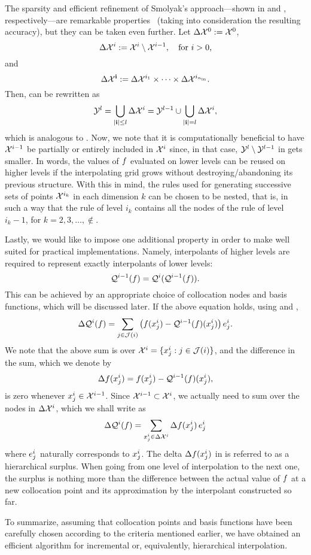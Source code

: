 The sparsity and efficient refinement of Smolyak's approach---shown in
 and , respectively---are
remarkable properties \perse\ (taking into consideration the resulting
accuracy), but they can be taken even further. Let $\Delta\mathcal{X}^0 := \mathcal{X}^0$,
\[
  \Delta\mathcal{X}^i := \mathcal{X}^i \setminus \mathcal{X}^{i - 1}, \quad \text{for $i > 0$,}
\]
and
\[
  \Delta\mathcal{X}^{\mathbf{i}} := \Delta\mathcal{X}^{i_1} \times \cdots \times \Delta\mathcal{X}^{i_{n_\text{in}}}.
\]
Then,  can be rewritten as
\begin{equation} \elab{smolyak-grid-incremental}
  \Y^l = \bigcup_{|\vi| \leq l} \Delta\X^i = \Y^{l - 1} \cup \bigcup_{|\vi| = l} \Delta\X^i,
\end{equation}
which is analogous to . Now, we note that it is
computationally beneficial to have $\mathcal{X}^{i - 1}$ be partially or entirely
included in $\mathcal{X}^i$ since, in that case, $\mathcal{Y}^l \setminus \mathcal{Y}^{l - 1}$ in
 gets smaller. In words, the values of $f$
evaluated on lower levels can be reused on higher levels if the interpolating
grid grows without destroying/abandoning its previous structure. With this in
mind, the rules used for generating successive sets of points $\mathcal{X}^{i_k}$ in each
dimension $k$ can be chosen to be nested, that is, in such a way that the rule
of level $i_k$ contains all the nodes of the rule of level $i_k - 1$, for $k =
2, 3, \dots, \nin$.

Lastly, we would like to impose one additional property in order to make
 well suited for practical implementations. Namely,
interpolants of higher levels are required to represent exactly interpolants
of lower levels:
\begin{equation} \elab{tensor-exactness}
  \tensor{i - 1}(\f) = \tensor{i}(\tensor{i - 1}(\f)).
\end{equation}
This can be achieved by an appropriate choice of collocation nodes and basis
functions, which will be discussed later. If the above equation holds, using
 and ,
\[
  \Delta\mathcal{Q}^{i}(f) = \sum_{j \in \mathcal{J}(i)} \left(f(x^i_j) - \mathcal{Q}^{i - 1}(f)(x^i_j)\right) e^i_j.
\]
We note that the above sum is over $\mathcal{X}^i = \{ x^i_j: j \in \mathcal{J}(i) \}$, and
the difference in the sum, which we denote by
\begin{equation} \elab{surplus}
  \surplus(\x^i_j) = \f(\x^i_j) - \tensor{i - 1}(\f)(\x^i_j),
\end{equation}
is zero whenever $x^i_j \in \mathcal{X}^{i - 1}$. Since $\mathcal{X}^{i - 1} \subset \mathcal{X}^i$, we
actually need to sum over the nodes in $\Delta\mathcal{X}^i$, which we shall write as
\[
  \Delta\mathcal{Q}^{i}(f) = \sum_{x^i_j \in \Delta\mathcal{X}^i} \Delta f(x^i_j) \, e^i_j
\]
where $e^i_j$ naturally corresponds to $x^i_j$. The delta $\Delta f(x^i_j)$
in  is referred to as a hierarchical surplus. When going from one
level of interpolation to the next one, the surplus is nothing more than the
difference between the actual value of $f$ at a new collocation point and its
approximation by the interpolant constructed so far.

To summarize, assuming that collocation points and basis functions have been
carefully chosen according to the criteria mentioned earlier, we have obtained
an efficient algorithm for incremental or, equivalently, hierarchical
interpolation.  
